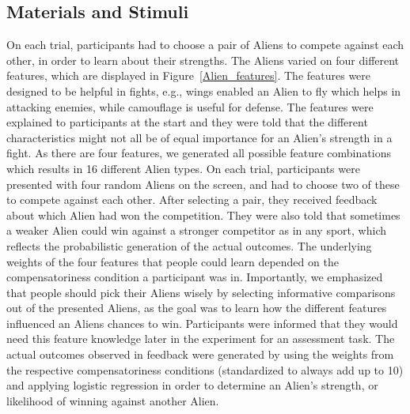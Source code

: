 \documentclass[10pt,letterpaper]{article}
\begin{document}
\subsection{Materials and Stimuli}
On each trial, participants had to choose a pair of Aliens to compete against each other, in order to learn about their strengths. The Aliens varied on four different features, which are displayed in Figure~\ref{Alien_features}. The features were designed to be helpful in fights, e.g., wings enabled an Alien to fly which helps in attacking enemies, while camouflage is useful for defense. The features were explained to participants at the start and they were told that the different characteristics might not all be of equal importance for an Alien's strength in a fight. As there are four features, we generated all possible feature combinations which results in 16 different Alien types. On each trial, participants were presented with four random Aliens on the screen, and had to choose two of these to compete against each other. After selecting a pair, they received feedback about which Alien had won the competition. They were also told that sometimes a weaker Alien could win against a stronger competitor as in any sport, which reflects the probabilistic generation of the actual outcomes. The underlying weights of the four features that people could learn depended on the compensatoriness condition a participant was in. Importantly, we emphasized that people should pick their Aliens wisely by selecting informative comparisons out of the presented Aliens, as the goal was to learn how the different features influenced an Aliens chances to win. Participants were informed that they would need this feature knowledge later in the experiment for an assessment task. The actual outcomes observed in feedback were generated by using the weights from the respective compensatoriness conditions (standardized to always add up to 10) and applying logistic regression in order to determine an Alien's strength, or likelihood of winning against another Alien. 
\end{document}
